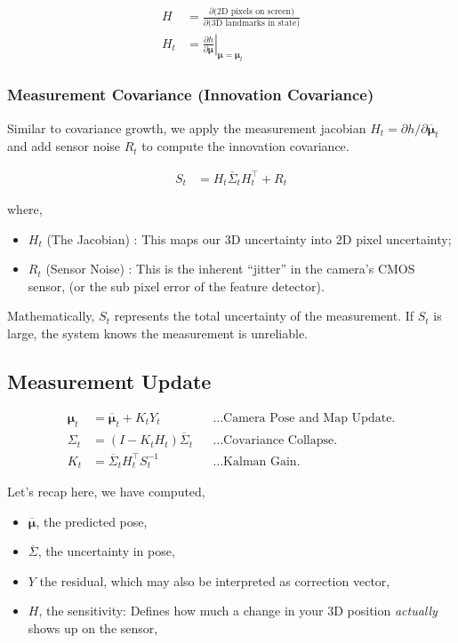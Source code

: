 \documentclass[11pt]{article}
\begin{document}
\begin{align*}
  H
  &= \frac {\partial \text{(2D pixels on screen)}}
    {\partial \text{(3D landmarks in state)}} \\
  H_t
  &= \left. \frac {\partial h} {\partial
    \boldsymbol{\mu}} \right\vert_{\boldsymbol{\mu} =
    \boldsymbol{\mu}_t}
\end{align*}
\subsubsection{Measurement Covariance (Innovation Covariance)}
\label{sec:org535eda4}

Similar to covariance growth, we apply the measurement
jacobian \(H_t = \partial h/\partial
\overline{\boldsymbol{\mu}}_{t}\) and add sensor noise
\(R_t\) to compute the innovation covariance.

\begin{align*}
  S_{t}
  &= H_t\overline{\Sigma}_tH_t^{\top} + R_t
\end{align*}

where,
\begin{itemize}
\item \(H_t\) (The Jacobian) : This maps our 3D uncertainty
into 2D pixel uncertainty;
\item \(R_t\) (Sensor Noise) : This is the inherent ``jitter''
in the camera's CMOS sensor, (or the sub pixel error
of the feature detector).
\end{itemize}

Mathematically, \(S_t\) represents the total uncertainty
of the measurement. If \(S_t\) is large, the system knows
the measurement is unreliable.
\subsection{Measurement Update}
\label{sec:measurement-update}
\begin{align*}
  \boldsymbol{\mu}_t
  &= \overline{\boldsymbol{\mu}}_t + K_t Y_t
  && \text{\ldots Camera Pose and Map Update.} \\
  \Sigma_t
  &= (I-K_tH_t)\overline{\Sigma}_t
  && \text{\ldots Covariance Collapse.}\\
  K_t
  &= \overline{\Sigma}_t H_t^{\top} S_t^{-1}
  && \text{\ldots Kalman Gain.}
\end{align*}

Let's recap here, we have computed,
\begin{itemize}
\item \(\overline{\boldsymbol{\mu}}\), the predicted pose,
\item \(\overline{\Sigma}\), the uncertainty in pose,
\item \(Y\) the residual, which may also be interpreted as
correction vector,
\item \(H\), the sensitivity: Defines how much a change in
your 3D position \emph{actually} shows up on the sensor,
\end{itemize}
\end{document}
